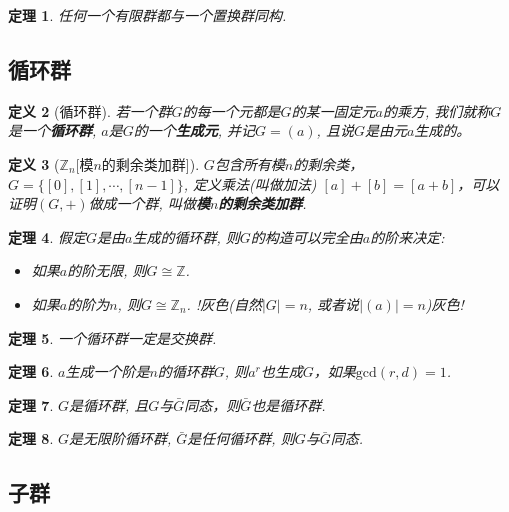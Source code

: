 \documentclass[UTF8]{ctexart}
\newtheorem{Definition}{定义}%
\newtheorem{Theorem}[Definition]{定理}
\begin{document}
\begin{Theorem}
任何一个有限群都与一个置换群同构.
\end{Theorem}

\subsection{循环群}

\begin{Definition}[循环群]
若一个群$G$的每一个元都是$G$的某一固定元$a$的乘方, 我们就称$G$是一个\textbf{循环群}, $a$是$G$的一个\textbf{生成元}, 并记$G = (a)$, 且说$G$是由元$a$生成的。
\end{Definition}

\begin{Definition}[$\mathbb{Z}_n$\mbox{[模$n$的剩余类加群]}]
$G$包含所有模$n$的剩余类，$G = \{ [0], [1], \cdots, [n-1] \}$, 定义乘法(叫做加法) $[a] + [b] = [a +b]$，可以证明$(G, +)$做成一个群, 叫做\textbf{模$n$的剩余类加群}.
\end{Definition}

\begin{Theorem}
假定$G$是由$a$生成的循环群, 则$G$的构造可以完全由$a$的阶来决定:
\begin{itemize}
\item 如果$a$的阶无限, 则$G \cong \mathbb{Z}$.
\item 如果$a$的阶为$n$, 则$G \cong \mathbb{Z}_n$. !灰色(自然$|G| = n$, 或者说$|(a)| = n$)灰色!
\end{itemize}
\end{Theorem}

\begin{Theorem}
一个循环群一定是交换群.
\end{Theorem}

\begin{Theorem}
$a$生成一个阶是$n$的循环群$G$, 则$a^r$也生成$G$，如果$\text{gcd}(r, d) = 1$.
\end{Theorem}

\begin{Theorem}
$G$是循环群, 且$G$与$\bar{G}$同态，则$\bar{G}$也是循环群.
\end{Theorem}

\begin{Theorem}
$G$是无限阶循环群, $\bar{G}$是任何循环群, 则$G$与$\bar{G}$同态.
\end{Theorem}

\subsection{子群}
\end{document}
